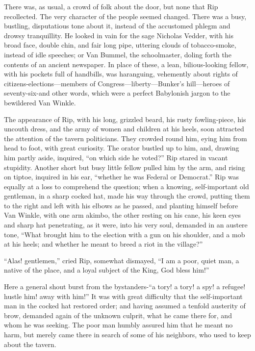 There was, as usual, a crowd of folk about the door, but none that Rip recollected. The very character of the people seemed changed. There was a busy, bustling, disputatious tone about it, instead of the accustomed phlegm and drowsy tranquillity. He looked in vain for the sage Nicholas Vedder, with his broad face, double chin, and fair long pipe, uttering clouds of tobacco-smoke, instead of idle speeches; or Van Bummel, the schoolmaster, doling forth the contents of an ancient newspaper. In place of these, a lean, bilious-looking fellow, with his pockets full of handbills, was haranguing, vehemently about rights of citizens-elections—members of Congress—liberty—Bunker’s hill—heroes of seventy-six-and other words, which were a perfect Babylonish jargon to the bewildered Van Winkle.

The appearance of Rip, with his long, grizzled beard, his rusty fowling-piece, his uncouth dress, and the army of women and children at his heels, soon attracted the attention of the tavern politicians. They crowded round him, eying him from head to foot, with great curiosity. The orator bustled up to him, and, drawing him partly aside, inquired, “on which side he voted?” Rip stared in vacant stupidity. Another short but busy little fellow pulled him by the arm, and rising on tiptoe, inquired in his ear, “whether he was Federal or Democrat.” Rip was equally at a loss to comprehend the question; when a knowing, self-important old gentleman, in a sharp cocked hat, made his way through the crowd, putting them to the right and left with his elbows as he passed, and planting himself before Van Winkle, with one arm akimbo, the other resting on his cane, his keen eyes and sharp hat penetrating, as it were, into his very soul, demanded in an austere tone, “What brought him to the election with a gun on his shoulder, and a mob at his heels; and whether he meant to breed a riot in the village?”

“Alas! gentlemen,” cried Rip, somewhat dismayed, “I am a poor, quiet man, a native of the place, and a loyal subject of the King, God bless him!”

Here a general shout burst from the bystanders-“a tory! a tory! a spy! a refugee! hustle him! away with him!” It was with great difficulty that the self-important man in the cocked hat restored order; and having assumed a tenfold austerity of brow, demanded again of the unknown culprit, what he came there for, and whom he was seeking. The poor man humbly assured him that he meant no harm, but merely came there in search of some of his neighbors, who used to keep about the tavern.

